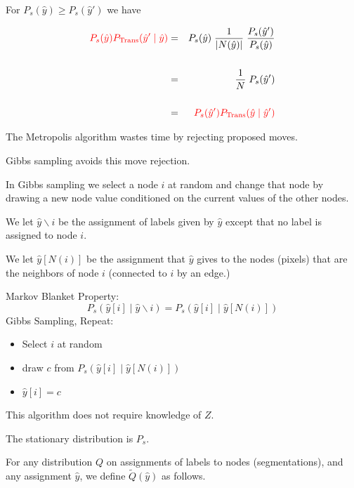 {

For $P_s(\hat{y}) \geq P_s(\hat{y}')$ we have

\begin{eqnarray*}
{\color{red} P_s(\hat{y})P_{\mathrm{Trans}}(\hat{y}'\;|\;\hat{y})} & = & P_s(\hat{y})\;\frac{1}{|N(\hat{y})|}\;\frac{P_s(\hat{y}')}{P_s(\hat{y})} \\
\\
& = & \frac{1}{N}\;P_s(\hat{y}') \\
\\
& = & {\color{red} P_s(\hat{y}')P_{\mathrm{Trans}}(\hat{y}\;|\;\hat{y}')}
\end{eqnarray*}


The Metropolis algorithm wastes time by rejecting proposed moves.

\vfill
Gibbs sampling avoids this move rejection.

\vfill
In Gibbs sampling we select a node $i$ at random and change that node by drawing a new node value conditioned on the current values of the other nodes.

\vfill
We let {\color{red} $\hat{y} \backslash i$} be the assignment of labels given by $\hat{y}$ except that no label is assigned to node $i$.

\vfill
We let {\color{red} $\hat{y}[N(i)]$} be the assignment that $\hat{y}$ gives to the nodes (pixels) that are the neighbors of node $i$ (connected to $i$ by an edge.)


Markov Blanket Property:
{\color{red} $$P_s(\hat{y}[i] \;|\;\hat{y} \backslash i) = P_s(\hat{y}[i] \;|\; \hat{y}[N(i)])$$}
\vfill
Gibbs Sampling, Repeat:

\begin{itemize}
\item   Select $i$ at random

\item draw $c$ from $P_s(\hat{y}[i] \;|\;\hat{y}[N(i)])$

\item $\hat{y}[i] = c$
\end{itemize}

\vfill
This algorithm does not require knowledge of $Z$.

\vfill
The stationary distribution is $P_s$.


For any distribution {\color{red} $Q$} on assignments of labels to nodes (segmentations), and any assignment {\color{red} $\hat{y}$},
we define {\color{red} $\tilde{Q}(\hat{y})$} as follows.

}
